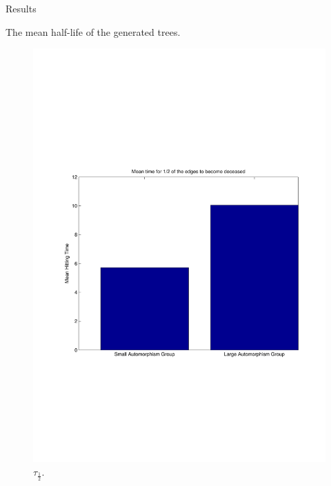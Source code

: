 \documentclass{beamer}
\begin{document}
\begin{frame}{Results}

The mean half-life of the generated trees.

\begin{figure}[H]
              \centering
            \includegraphics[scale=0.3]{halof.pdf}
                \caption{$\tau_{\frac{1}{2}}$.}\label{t12}
\end{figure}
\end{frame}
\end{document}
